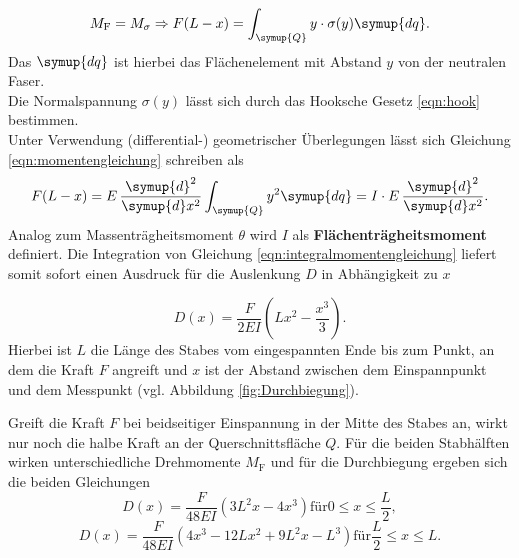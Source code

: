\begin{equation}
	\label{eqn:momentengleichung}
	M_{\mathrm{F}}=M_{\mathrm{\sigma}} \Rightarrow F(L-x)=\int_{\symup{Q}}^{} y \cdot \sigma(y) \symup{dq} \mathrm{.}
\end{equation}
Das $\symup{dq}$ ist hierbei das Flächenelement mit Abstand $y$ von der neutralen Faser. \\
Die Normalspannung $\sigma(y)$ lässt sich durch das Hooksche Gesetz \eqref{eqn:hook} bestimmen.\\
Unter Verwendung (differential-) geometrischer Überlegungen lässt sich Gleichung \eqref{eqn:momentengleichung} schreiben als
\begin{equation}
	\label{eqn:integralmomentengleichung}
	F(L-x)=E \, \frac{\symup{d}^2}{\symup{d}x^2} \int_{\symup{Q}}^{} y^2 \symup{dq}=I \cdot E\, \frac{\symup{d}^2}{\symup{d}x^2} \mathrm{.}
\end{equation}
Analog zum Massenträgheitsmoment $\theta$ wird $I$ als \textbf{Flächenträgheitsmoment} definiert.
Die Integration von Gleichung  \eqref{eqn:integralmomentengleichung} liefert somit sofort einen Ausdruck für die Auslenkung $D$ in Abhängigkeit zu $x$

\begin{equation}
	\label{eqn:d_x_einseitig}
	D(x)=\frac{F}{2EI}\left(Lx^2-\frac{x^3}{3}\right) \text{.}
\end{equation}
Hierbei ist $L$ die Länge des Stabes vom eingespannten Ende bis zum Punkt, an dem die Kraft $F$ angreift und $x$ ist der Abstand zwischen dem Einspannpunkt und dem Messpunkt (vgl. Abbildung \ref{fig:Durchbiegung}).

Greift die Kraft $F$ bei beidseitiger Einspannung in der Mitte des Stabes an, wirkt nur noch die halbe Kraft an der Querschnittsfläche $Q$. Für die beiden Stabhälften wirken unterschiedliche Drehmomente $M_{\mathrm{F}}$ und für die Durchbiegung ergeben sich die beiden Gleichungen
\begin{equation}
	\label{eqn:d_x_beidseitig_eins}
	D(x)=\frac{F}{48EI}\left(3L^2x-4x^3\right) \mathrm{ für } 0\leq x\leq\frac{L}{2} \mathrm{,}
\end{equation}
\begin{equation}
	\label{eqn:d_x_beidseitig_zwei}
	D(x)=\frac{F}{48EI}\left(4x^3-12 Lx^2+9 L^2x-L^3\right) \mathrm{ für } \frac{L}{2}\leq x \leq L \mathrm{.}
\end{equation}
